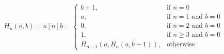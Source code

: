 \documentclass[preview]{standalone}
\begin{document}
\begin{align*}
H_n(a, b)=a[n]b=\begin{cases}b+1, & \text{if } n=0 \\a, & \text{if } n=1 \text{ and } b=0 \\0, & \text{if } n=2 \text{ and } b=0 \\1, & \text{if } n \geq 3 \text{ and } b=0 \\H_{n-1}(a,H_n(a,b-1)), & \text{otherwise}\end{cases}
\end{align*}
\end{document}
